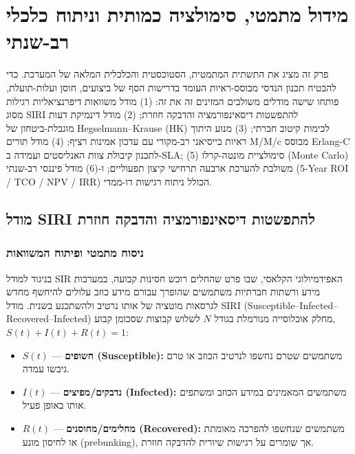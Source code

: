 
\section{מידול מתמטי, סימולציה כמותית וניתוח כלכלי רב-שנתי}
\label{sec:simulator-modeling}

פרק זה מציג את התשתית המתמטית, הסטוכסטית והכלכלית המלאה של המערכת. כדי להבטיח תכנון הנדסי מבוסס-ראיות העומד בדרישות הסף של ביצועים, חוסן ועלות-תועלת, פותחו שישה מודלים משולבים המזינים זה את זה:
(1) מודל משוואות דיפרנציאליות רגילות מסוג \textenglish{SIRI} להתפשטות דיסאינפורמציה והדבקה חוזרת;
(2) מודל דינמיקת דעות מוגבלת-ביטחון של \textenglish{Hegselmann--Krause (HK)} לכימות קיטוב חברתי;
(3) מנוע היתוך ראיות בייסיאני רב-מקורי עם עדכון אמינות רציף;
(4) מודל תורים \textenglish{M/M/c} מבוסס \textenglish{Erlang-C} לתכנון קיבולת צוות האנליסטים ועמידה ב-\textenglish{SLA};
(5) סימולציית מונטה-קרלו (\textenglish{Monte Carlo}) משולבת להערכת ארבעה תרחישי קיצון תפעוליים;
ו-(6) מודל פיננסי רב-שנתי (\textenglish{5-Year ROI / TCO / NPV / IRR}) הכולל ניתוח רגישות דו-ממדי.

\subsection{מודל \textenglish{SIRI} להתפשטות דיסאינפורמציה והדבקה חוזרת}
\label{subsec:siri-ode}

\subsubsection{ניסוח מתמטי ופיתוח המשוואות}
בניגוד למודל \textenglish{SIR} האפידמיולוגי הקלאסי, שבו פרט שהחלים רוכש חסינות קבועה, במערכות מידע ורשתות חברתיות משתמשים שהופרך עבורם מידע כוזב עלולים להיחשף מחדש לגרסאות מוטציה של אותו נרטיב ולהשתכנע בשנית. מודל \textenglish{SIRI} (\textenglish{Susceptible--Infected--Recovered--Infected}) מחלק אוכלוסייה מנורמלת בגודל $N$ לשלוש קבוצות שסכומן קבוע, $S(t) + I(t) + R(t) = 1$:
\begin{itemize}
    \item $S(t)$ --- \textbf{חשופים (\textenglish{Susceptible}):} משתמשים שטרם נחשפו לנרטיב הכוזב או טרם גיבשו עמדה.
    \item $I(t)$ --- \textbf{נדבקים/מפיצים (\textenglish{Infected}):} משתמשים המאמינים במידע הכוזב ומשתפים אותו באופן פעיל.
    \item $R(t)$ --- \textbf{מחלימים/מחוסנים (\textenglish{Recovered}):} משתמשים שנחשפו להפרכה מאומתת או לחיסון מונע (\textenglish{prebunking}), אך שומרים על רגישות שיורית להדבקה חוזרת.
\end{itemize}

